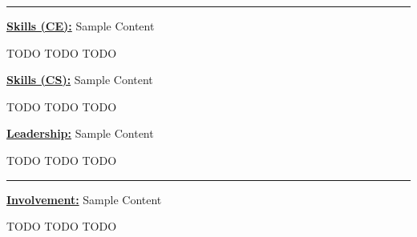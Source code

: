 \documentclass[letterpaper,10pt]{article}
\begin{document}
{\centering\noindent\rule{7.75in}{0.5pt}}\break

\noindent
\textbf{\underline{Skills (CE):}}\hspace{1.4em}%
%
Sample Content
%
\begin{adjustwidth}{1.2in}{0in}
	TODO\break
	TODO\break
	TODO\break
\end{adjustwidth}

\noindent
\textbf{\underline{Skills (CS):}}\hspace{1.4em}%
%
Sample Content
%
\begin{adjustwidth}{1.2in}{0in}
	TODO\break
	TODO\break
	TODO\break
\end{adjustwidth}

\noindent
\textbf{\underline{Leadership:}}\hspace{2em}%
%
Sample Content
%
\begin{adjustwidth}{1.2in}{0in}
	TODO\break
	TODO\break
	TODO
\end{adjustwidth}

{\centering\noindent\rule{7.75in}{0.5pt}}\break

\noindent
\textbf{\underline{Involvement:}}\hspace{1.35em}%
%
Sample Content
%
\begin{adjustwidth}{1.2in}{0in}
	TODO\break
	TODO\break
	TODO\break
\end{adjustwidth}
\end{document}
